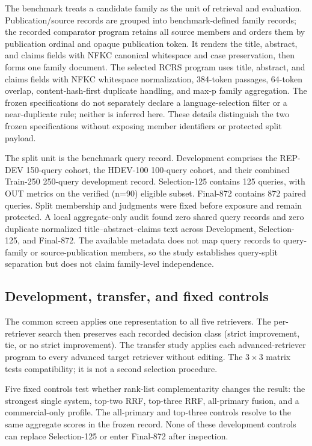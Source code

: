\documentclass[final,5p,times,twocolumn]{elsarticle}
\begin{document}
The benchmark treats a candidate family as the unit of retrieval and
evaluation. Publication/source records are grouped into benchmark-defined
family records; the recorded comparator program retains all source members and
orders them by publication ordinal and opaque publication token. It renders
the title, abstract, and claims fields with NFKC canonical whitespace and
case preservation, then forms one family document. The selected RCRS program
uses title, abstract, and claims fields with NFKC whitespace normalization,
384-token passages, 64-token overlap, content-hash-first duplicate handling,
and max-p family aggregation. The frozen specifications do not separately
declare a language-selection filter or a near-duplicate rule; neither is
inferred here. These details distinguish the two frozen specifications without
exposing member identifiers or protected split payload.

The split unit is the benchmark query record. Development comprises the
REP-DEV 150-query cohort, the HDEV-100 100-query cohort, and their combined
Train-250 250-query development record. Selection-125 contains 125 queries,
with OUT metrics on the verified (n=90) eligible subset. Final-872 contains
872 paired queries. Split membership and judgments were fixed before exposure
and remain protected. A local aggregate-only audit found zero shared query
records and zero duplicate normalized title--abstract--claims text across
Development, Selection-125, and Final-872. The available metadata does not map
query records to query-family or source-publication members, so the study
establishes query-split separation but does not claim family-level
independence.

\subsection{Development, transfer, and fixed controls}

The common screen applies one representation to all five retrievers. The
per-retriever search then preserves each recorded decision class (strict
improvement, tie, or no strict improvement). The transfer study applies each
advanced-retriever program to every advanced target retriever without editing.
The \(3\times3\) matrix tests compatibility; it is not a second selection
procedure.

Five fixed controls test whether rank-list complementarity changes the result:
the strongest single system, top-two RRF, top-three RRF, all-primary fusion,
and a commercial-only profile. The all-primary and top-three controls resolve
to the same aggregate scores in the frozen record. None of these
development controls can replace Selection-125 or enter Final-872 after
inspection.
\end{document}
